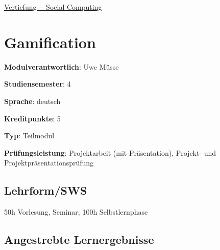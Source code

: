 \hyperref[/mi-2017/modulbeschreibungen-bachelor/BA_Vertiefung_SocialComputing]{Vertiefung – Social Computing}

\hypertarget{gamificationpathlabelmi-2017modulbeschreibungen-bachelorba_sc_gamification}{%
\chapter{Gamification\label{/mi-2017/modulbeschreibungen-bachelor/BA_SC_gamification}}\label{gamificationpathlabelmi-2017modulbeschreibungen-bachelorba_sc_gamification}}

\begin{modulHead}
\textbf{Modulverantwortlich}: Uwe
Müsse
\end{modulHead}
\begin{modulHead}
\textbf{Studiensemester}:
4
\end{modulHead}
\begin{modulHead}
\textbf{Sprache}:
deutsch
\end{modulHead}
\begin{modulHead}
\textbf{Kreditpunkte}:
5
\end{modulHead}
\begin{modulHead}
\textbf{Typ}:
Teilmodul
\end{modulHead}
\begin{modulHead}
\textbf{Prüfungsleistung}:
Projektarbeit (mit Präsentation), Projekt- und
Projektpräsentationsprüfung
\end{modulHead}


\hypertarget{lehrformswspathlabelmi-2017modulbeschreibungen-bachelorba_sc_gamification}{%
\section*{Lehrform/SWS\label{/mi-2017/modulbeschreibungen-bachelor/BA_SC_gamification}}\label{lehrformswspathlabelmi-2017modulbeschreibungen-bachelorba_sc_gamification}}

50h Vorlesung, Seminar; 100h Selbstlernphase

\hypertarget{angestrebte-lernergebnissepathlabelmi-2017modulbeschreibungen-bachelorba_sc_gamification}{%
\section*{Angestrebte
Lernergebnisse\label{/mi-2017/modulbeschreibungen-bachelor/BA_SC_gamification}}\label{angestrebte-lernergebnissepathlabelmi-2017modulbeschreibungen-bachelorba_sc_gamification}}

